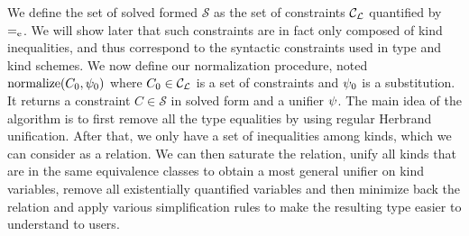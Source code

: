 We define the set of solved formed
$\mathcal S$ as the set of constraints ${\mathcal C_{\mathcal L}}$ quantified by $\operatorname{=_e}$.
We will show later that such constraints are in fact only composed of
kind inequalities, and thus correspond to the syntactic constraints
used in type and kind schemes.
%
We now define our normalization procedure, noted $\operatorname{normalize}(C_0,\mathrm{\psi}_0)$ where
$C_0\in {\mathcal C_{\mathcal L}}$ is a set of constraints and $\mathrm{\psi}_0$ is a substitution.
It returns a constraint $C \in \mathcal S$ in
solved form and a unifier $\mathrm{\psi}$.
The main idea of the algorithm is to first remove all the type equalities
by using regular Herbrand unification. After that, we only have
a set of inequalities among kinds, which we can consider as a relation.
We can then saturate the relation,
unify all kinds that are in the same equivalence classes to obtain
a most general unifier on kind variables,
remove all existentially quantified variables and
then minimize back the relation and apply various
simplification rules to make the resulting type easier to understand to users.

